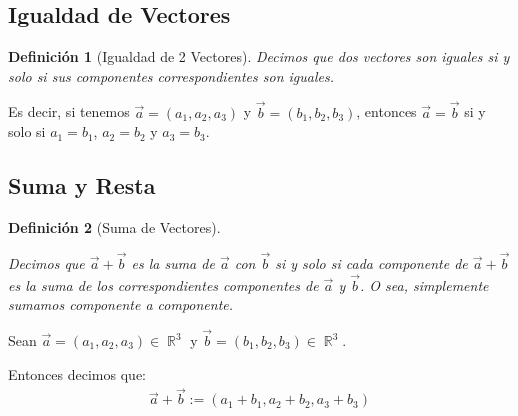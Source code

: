 \documentclass[12pt, fleqn]{report}                             %
\newtheorem{Definition}{Definición}[section]                    %
\theoremstyle{break}                                            %
\DeclareMathOperator \Reals        {\mathbb{R}}                 %
\begin{document}
            \subsection{Igualdad de Vectores}

                \begin{Definition}[Igualdad de 2 Vectores]
                    \label{DefIgualdadVectores}
                    Decimos que dos vectores son iguales si y solo si sus componentes
                    correspondientes son iguales.
                \end{Definition}

                Es decir, si tenemos $\vec{a} = (a_1, a_2, a_3)$ y $\vec{b} = (b_1, b_2, b_3)$,
                entonces $\vec{a} = \vec{b}$ si y solo si $a_1 = b_1$, $a_2 = b_2$ y $a_3 = b_3$.

            
            \subsection{Suma y Resta}
            
                \begin{Definition}[Suma de Vectores]
                    \label{DefSumaVectores}

                    Decimos que $\vec{a}+\vec{b}$ es la suma de $\vec{a}$ con $\vec{b}$ si y solo si 
                    cada componente de $\vec{a}+\vec{b}$ es la suma de los correspondientes componentes
                    de $\vec{a}$ y $\vec{b}$.
                    O sea, simplemente sumamos componente a componente.

                \end{Definition}

                Sean $\vec{a} = (a_1, a_2, a_3) \in \Reals^3$ y $\vec{b}=(b_1, b_2, b_3) \in \Reals^3$.

                Entonces decimos que:
                \begin{align}
                    \vec{a} + \vec{b} := (a_1 + b_1, a_2 + b_2, a_3 + b_3)
                \end{align}
            
\end{document}
